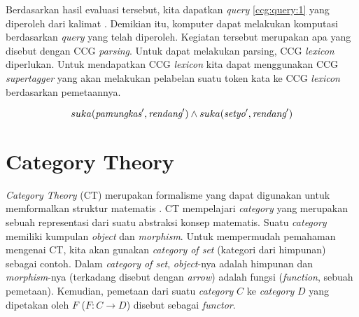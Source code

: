 Berdasarkan hasil evaluasi tersebut, kita dapatkan \textit{query} \ref{ccg:query:1}
yang diperoleh dari kalimat .
Demikian itu, komputer dapat melakukan komputasi berdasarkan \textit{query} yang telah diperoleh.
Kegiatan tersebut merupakan apa yang disebut dengan CCG \textit{parsing}.
Untuk dapat melakukan parsing, CCG \textit{lexicon} diperlukan.
Untuk mendapatkan CCG \textit{lexicon} kita dapat menggunakan CCG \textit{supertagger}
yang akan melakukan pelabelan suatu token kata ke CCG \textit{lexicon} berdasarkan
pemetaannya.

\begin{equation}\label{ccg:query:1}
  suka(\mbox{\it pamungkas}^\prime, \mbox{\it rendang}^\prime) \land suka(\mbox{\it setyo}^\prime, \mbox{\it rendang}^\prime)
\end{equation}

\section{Category Theory}
\textit{Category Theory} (CT) merupakan formalisme yang dapat digunakan untuk memformalkan
struktur matematis \cite{intro-cat-kurz}.
CT mempelajari \textit{category} yang merupakan sebuah representasi dari suatu
abstraksi konsep matematis.
Suatu \textit{category} memiliki kumpulan \textit{object} dan \textit{morphism}.
Untuk mempermudah pemahaman mengenai CT, kita akan gunakan
\textit{category of set} (kategori dari himpunan) sebagai contoh.
Dalam \textit{category of set}, \textit{object}-nya adalah himpunan dan
\textit{morphism}-nya (terkadang disebut dengan \textit{arrow}) adalah fungsi
(\textit{function}, sebuah pemetaan).
Kemudian, pemetaan dari suatu \textit{category} $C$ ke \textit{category} $D$
yang dipetakan oleh $F$ ($F: C \rightarrow D$) disebut sebagai \textit{functor}.


